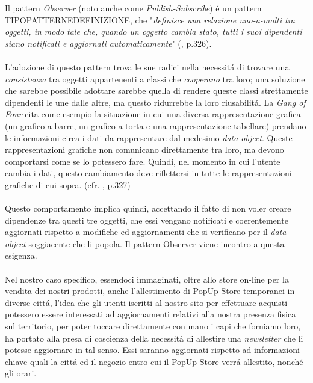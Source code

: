 \documentclass[12pt]{article}
\begin{document}
Il pattern \textit{Observer} (noto anche come \textit{Publish-Subscribe}) \'e un pattern TIPOPATTERNEDEFINIZIONE, che "\textit{definisce una relazione uno-a-molti tra oggetti, in modo tale che, quando un oggetto cambia stato, tutti i suoi dipendenti siano notificati e aggiornati automaticamente}" (\cite{gof_riferimento}, p.326). 
\\
\\
L'adozione di questo pattern trova le sue radici nella necessit\'a di trovare una \textit{consistenza} tra oggetti appartenenti a classi che \textit{cooperano} tra loro; una soluzione che sarebbe possibile adottare sarebbe quella di rendere queste classi strettamente dipendenti le une dalle altre, ma questo ridurrebbe la loro riusabilit\'a. La \textit{Gang of Four} cita come esempio la situazione in cui una diversa rappresentazione grafica (un grafico a barre, un grafico a torta e una rappresentazione tabellare) prendano le informazioni circa i dati da rappresentare dal medesimo \textit{data object}. Queste rappresentazioni grafiche non comunicano direttamente tra loro, ma devono comportarsi come se lo potessero fare. Quindi, nel momento in cui l'utente cambia i dati, questo cambiamento deve riflettersi in tutte le rappresentazioni grafiche di cui sopra. (cfr. \cite{gof_riferimento}, p.327)
\\
\\
Questo comportamento implica quindi, accettando il fatto di non voler creare dipendenze tra questi tre oggetti, che essi vengano notificati e coerentemente aggiornati rispetto a modifiche ed aggiornamenti che si verificano per il \textit{data object} soggiacente che li popola. Il pattern Observer viene incontro a questa esigenza. 
\\
\\
Nel nostro caso specifico, essendoci immaginati, oltre allo store on-line per la vendita dei nostri prodotti, anche l'allestimento di PopUp-Store temporanei in diverse citt\'a, l'idea che gli utenti iscritti al nostro sito per effettuare acquisti potessero essere interessati ad aggiornamenti relativi alla nostra presenza fisica sul territorio, per poter toccare direttamente con mano i capi che forniamo loro, ha portato alla presa di coscienza della necessit\'a di allestire una \textit{newsletter} che li potesse aggiornare in tal senso. Essi saranno aggiornati rispetto ad informazioni chiave quali la citt\'a ed il negozio entro cui il PopUp-Store verr\'a allestito, nonch\'e gli orari. 
\\
\\
\end{document}
